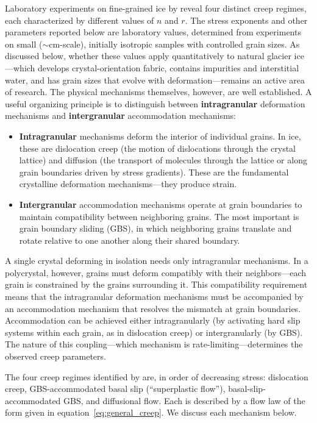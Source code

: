 \documentclass[11pt]{article}
\begin{document}
Laboratory experiments on fine-grained ice by \cite{GoldsbyKohlstedt2001} reveal four distinct creep regimes, each characterized by different values of $n$ and $r$.  The stress exponents and other parameters reported below are laboratory values, determined from experiments on small ($\sim$cm-scale), initially isotropic samples with controlled grain sizes.  As discussed below, whether these values apply quantitatively to natural glacier ice---which develops crystal-orientation fabric, contains impurities and interstitial water, and has grain sizes that evolve with deformation---remains an active area of research.  The physical mechanisms themselves, however, are well established.  A useful organizing principle is to distinguish between \textbf{intragranular} deformation mechanisms and \textbf{intergranular} accommodation mechanisms:
\begin{itemize}
  \item \textbf{Intragranular} mechanisms deform the interior of individual grains.  In ice, these are dislocation creep (the motion of dislocations through the crystal lattice) and diffusion (the transport of molecules through the lattice or along grain boundaries driven by stress gradients).  These are the fundamental crystalline deformation mechanisms---they produce strain.
  \item \textbf{Intergranular} accommodation mechanisms operate at grain boundaries to maintain compatibility between neighboring grains.  The most important is grain boundary sliding (GBS), in which neighboring grains translate and rotate relative to one another along their shared boundary.
\end{itemize}

\noindent A single crystal deforming in isolation needs only intragranular mechanisms.  In a polycrystal, however, grains must deform compatibly with their neighbors---each grain is constrained by the grains surrounding it.  This compatibility requirement means that the intragranular deformation mechanisms must be accompanied by an accommodation mechanism that resolves the mismatch at grain boundaries.  Accommodation can be achieved either intragranularly (by activating hard slip systems within each grain, as in dislocation creep) or intergranularly (by GBS).  The nature of this coupling---which mechanism is rate-limiting---determines the observed creep parameters.

\medskip
\noindent The four creep regimes identified by \cite{GoldsbyKohlstedt2001} are, in order of decreasing stress: dislocation creep, GBS-accommodated basal slip (``superplastic flow''), basal-slip-accommodated GBS, and diffusional flow.  Each is described by a flow law of the form given in equation~\eqref{eq:general_creep}.  We discuss each mechanism below.
\end{document}
